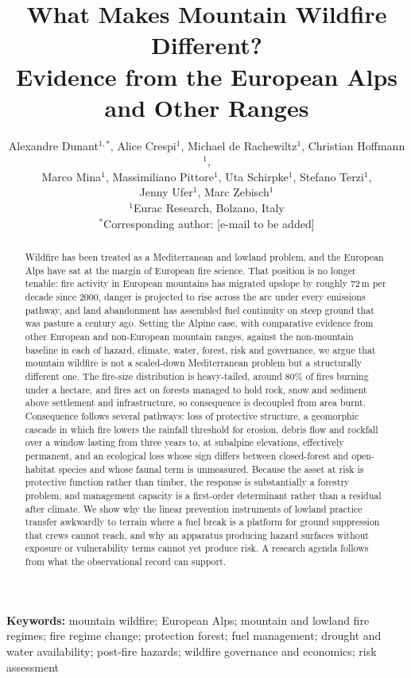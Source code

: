 \documentclass[11pt,a4paper]{article}
\title{
What Makes Mountain Wildfire Different?\\
Evidence from the European Alps and Other Ranges
}
\author{
Alexandre Dunant$^{1,*}$, Alice Crespi$^{1}$, Michael de Rachewiltz$^{1}$, Christian Hoffmann$^{1}$,\\
Marco Mina$^{1}$, Massimiliano Pittore$^{1}$, Uta Schirpke$^{1}$, Stefano Terzi$^{1}$,\\
Jenny Ufer$^{1}$, Marc Zebisch$^{1}$ \\
\small $^{1}$Eurac Research, Bolzano, Italy \\
\small $^{*}$Corresponding author: [e-mail to be added]
}
\date{}
\begin{document}
\maketitle


\begin{abstract}
\noindent
Wildfire has been treated as a Mediterranean and lowland problem, and the European Alps have sat at the margin of European fire science. That position is no longer tenable: fire activity in European mountains has migrated upslope by roughly 72\,m per decade since 2000, danger is projected to rise across the arc under every emissions pathway, and land abandonment has assembled fuel continuity on steep ground that was pasture a century ago. Setting the Alpine case, with comparative evidence from other European and non-European mountain ranges, against the non-mountain baseline in each of hazard, climate, water, forest, risk and governance, we argue that mountain wildfire is not a scaled-down Mediterranean problem but a structurally different one. The fire-size distribution is heavy-tailed, around 80\% of fires burning under a hectare, and fires act on forests managed to hold rock, snow and sediment above settlement and infrastructure, so consequence is decoupled from area burnt. Consequence follows several pathways: loss of protective structure, a geomorphic cascade in which fire lowers the rainfall threshold for erosion, debris flow and rockfall over a window lasting from three years to, at subalpine elevations, effectively permanent, and an ecological loss whose sign differs between closed-forest and open-habitat species and whose faunal term is unmeasured. Because the asset at risk is protective function rather than timber, the response is substantially a forestry problem, and management capacity is a first-order determinant rather than a residual after climate. We show why the linear prevention instruments of lowland practice transfer awkwardly to terrain where a fuel break is a platform for ground suppression that crews cannot reach, and why an apparatus producing hazard surfaces without exposure or vulnerability terms cannot yet produce risk. A research agenda follows from what the observational record can support.
\end{abstract}

\noindent\textbf{Keywords:}
mountain wildfire; European Alps; mountain and lowland fire regimes; fire regime change; protection forest; fuel management; drought and water availability; post-fire hazards; wildfire governance and economics; risk assessment
\end{document}
